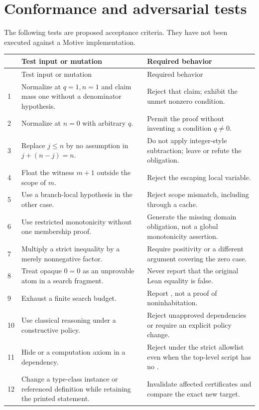 \documentclass[11pt,a4paper]{article}
\newcommand{\code}[1]{\texttt{\detokenize{#1}}}
\theoremstyle{remark}
\begin{document}
\section{Conformance and adversarial tests}
\label{app:tests}
The following tests are proposed acceptance criteria. They have not been executed against a Motive implementation.
\begin{longtable}{@{}p{}p{}p{}@{}}
\toprule
 & Test input or mutation & Required behavior\\
\midrule
\endfirsthead
\toprule & Test input or mutation & Required behavior\\\midrule
\endhead
1 & Normalize at $q=1,n=1$ and claim mass one without a denominator hypothesis. & Reject that claim; exhibit the unmet nonzero condition.\\
2 & Normalize at $n=0$ with arbitrary $q$. & Permit the proof without inventing a condition $q\ne0$.\\
3 & Replace $j\leq n$ by no assumption in $j+(n-j)=n$. & Do not apply integer-style subtraction; leave or refute the obligation.\\
4 & Float the witness $m+1$ outside the scope of $m$. & Reject the escaping local variable.\\
5 & Use a branch-local hypothesis in the other case. & Reject scope mismatch, including through a cache.\\
6 & Use restricted monotonicity without one membership proof. & Generate the missing domain obligation, not a global monotonicity assertion.\\
7 & Multiply a strict inequality by a merely nonnegative factor. & Require positivity or a different argument covering the zero case.\\
8 & Treat opaque $0=0$ as an unprovable atom in a search fragment. & Never report that the original Lean equality is false.\\
9 & Exhaust a finite search budget. & Report \code{UnknownBudget}, not a proof of noninhabitation.\\
10 & Use classical reasoning under a constructive policy. & Reject unapproved dependencies or require an explicit policy change.\\
11 & Hide \code{sorryAx} or a computation axiom in a dependency. & Reject under the strict allowlist even when the top-level script has no \code{sorry}.\\
12 & Change a type-class instance or referenced definition while retaining the printed statement. & Invalidate affected certificates and compare the exact new target.\\

\end{longtable}
\end{document}
